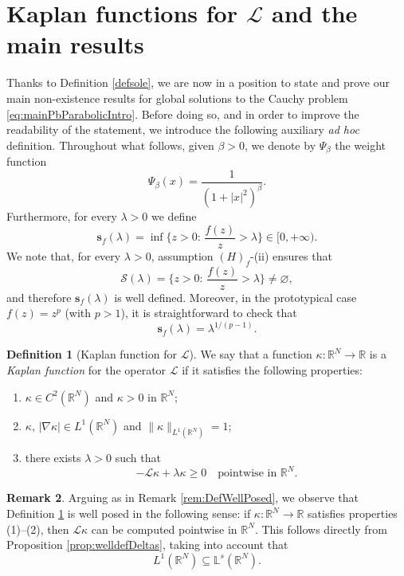\documentclass[11pt,a4paper,reqno]{amsart}
\def \LL {\mathcal{L}}
\theoremstyle{definition}
\newtheorem{definition}{Definition}[section]
\newtheorem{remark}[definition]{Remark}
\theoremstyle{plain}
\numberwithin{equation}{section}
\begin{document}
\section{Kaplan functions for $\LL$ and the main results} \label{sec:MainThm}

Thanks to Definition \ref{defsole}, we are now in a position to state and prove our main non-exi\-stence results for global solutions to the Cauchy problem \eqref{eq:mainPbParabolicIntro}.
Before doing so, and in order to improve the readability of the statement, we introduce the following auxiliary \emph{ad hoc} definition.
Throughout what follows, given $\beta > 0$, we denote by $\Psi_\beta$ the weight function
$$\Psi_\beta(x) = \frac{1}{(1+|x|^2)^\beta}.$$
Furthermore, for every $\lambda > 0$ we define
\begin{equation} \label{eq:defsflambda}
\mathbf{s}_f(\lambda) = \inf\Big\{z > 0:\,\frac{f(z)}{z} > \lambda\Big\}\in[0,+\infty).	
\end{equation}
We note that, for every $\lambda > 0$, assumption $(H)_f$-(ii) ensures that
$$
\mathcal{S}(\lambda) = \Big\{z > 0:\,\frac{f(z)}{z} > \lambda\Big\}\neq \varnothing,
$$
and therefore $\mathbf{s}_f(\lambda)$ is well defined. Moreover, in the prototypical case $f(z)=z^p$ (with $p>1$), it is straightforward to check that
\begin{equation} \label{eq:sflambdapower}
\mathbf{s}_f(\lambda) = \lambda^{1/(p-1)}.
\end{equation}
\begin{definition}[Kaplan function for $\LL$] \label{def:KaplanFunction}
We say that a function $\kappa:\mathbb{R}^N\to\mathbb{R}$ is a \emph{Kaplan function} for the operator $\LL$ if it satisfies the following properties:
\begin{enumerate}
	\item $\kappa\in C^2(\mathbb{R}^N)$ and $\kappa > 0$ in $\mathbb{R}^N$;
	\vspace{0.1cm}
		 		
	\item $\kappa,\,|\nabla\kappa|\in L^1(\mathbb{R}^N)$ and $\|\kappa\|_{L^1(\mathbb{R}^N)} = 1$;
	\vspace{0.1cm}
	
	\item there exists $\lambda > 0$ such that
	$$-\LL\kappa+\lambda\kappa \geq 0 \quad \text{pointwise in }\mathbb{R}^N.$$
\end{enumerate}
\end{definition}

\begin{remark} \label{re:WellPosedDefKaplan}
Arguing as in Remark \ref{rem:DefWellPosed}, we observe that Definition \ref{def:KaplanFunction} is well posed in the following sense: if $\kappa:\mathbb{R}^N\to\mathbb{R}$ satisfies properties (1)--(2), then $\LL\kappa$ can be computed pointwise in $\mathbb{R}^N$.
This follows directly from Proposition \ref{prop:welldefDeltas}, taking into account that
$$L^1(\mathbb{R}^N)\subseteq\mathbb{L}^s(\mathbb{R}^N).$$
\end{remark}
\end{document}
